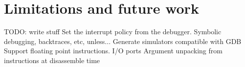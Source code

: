 \chapter{Limitations and future work}
TODO: write stuff
Set the interrupt policy from the debugger.
Symbolic debugging, backtraces, etc, unless...
Generate simulators compatible with GDB
Support floating point instructions.
I/O ports
Argument unpacking from instructions at disassemble time
